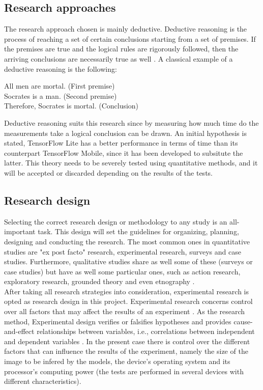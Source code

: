 \subsection{Research approaches}
The research approach chosen is mainly deductive. Deductive reasoning is the process of reaching a set of certain conclusions starting from a set of premises. If the premises are true and the logical rules are rigorously followed, then the arriving conclusions are necessarily true as well \cite{burns2000introduction}. A classical example of a deductive reasoning is the following:
\begin{center}
All men are mortal. (First premise) \\
Socrates is a man. (Second premise) \\
Therefore, Socrates is mortal. (Conclusion) \cite{dewey1914logical}\\
\end{center}
Deductive reasoning suits this research since by measuring how much time do the measurements take a logical conclusion can be drawn. An initial hypothesis is stated, TensorFlow Lite has a better performance in terms of time than its counterpart TensorFlow Mobile, since it has been developed to subsitute the latter. This theory needs to be severely tested using quantitative methods, and it will be accepted or discarded depending on the results of the tests. 

\subsection{Research design}
Selecting the correct research design or methodology to any study is an all-important task. This design will set the guidelines for organizing, planning, designing and conducting the research. The most common ones in quantitative studies are "ex post facto" research, experimental research, surveys and case studies. Furthermore, qualitative studies share as well some of these (surveys or case studies) but have as well some particular ones, such as action research, exploratory research, grounded theory and even etnography \cite{haakansson}. \\

After taking all research strategies into consideration, experimental research is opted as research design in this project. Experimental research concerns control over all factors that may affect the results of an experiment \cite{burns2000introduction}. As the research method, Experimental design verifies or falsifies hypotheses and provides cause-and-effect relationships between variables, i.e., correlations between independent and dependent variables \cite{haakansson}. In the present case there is control over the different factors that can influence the results of the experiment, namely the size of the image to be infered by the models, the device's operating system and its processor's computing power (the tests are performed in several devices with different characteristics). 
	
